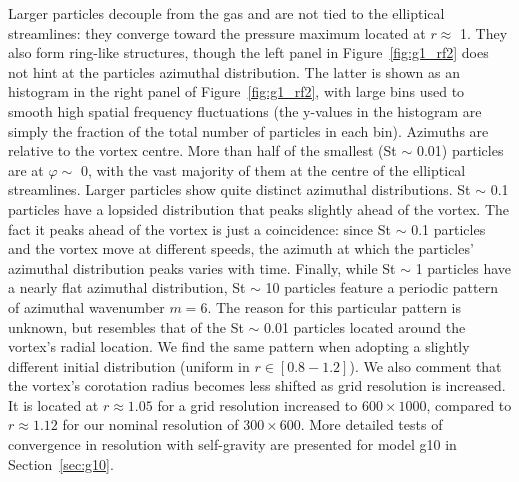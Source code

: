 \documentclass[a4paper,usenatbib]{mnras}
\begin{document}
Larger particles decouple from the gas and are not tied to the
elliptical streamlines: they converge toward the pressure maximum
located at $r \approx$ 1. They also form ring-like structures, though
the left panel in Figure~\ref{fig:g1_rf2} does not hint at the
particles azimuthal distribution. The latter is shown as an histogram
in the right panel of Figure~\ref{fig:g1_rf2}, with large bins used to
smooth high spatial frequency fluctuations (the y-values in the
histogram are simply the fraction of the total number of particles in
each bin). Azimuths are relative to the vortex centre.  More than half
of the smallest (St $\sim$ 0.01) particles are at $\varphi \sim$ 0,
with the vast majority of them at the centre of the elliptical
streamlines. Larger particles show quite distinct azimuthal
distributions.  St $\sim$ 0.1 particles have a lopsided distribution
that peaks slightly ahead of the vortex. The fact it peaks ahead of
the vortex is just a coincidence: since St $\sim$ 0.1 particles and
the vortex move at different speeds, the azimuth at which the
particles' azimuthal distribution peaks varies with time. Finally,
while St $\sim$ 1 particles have a nearly flat azimuthal distribution,
St $\sim$ 10 particles feature a periodic pattern of azimuthal
wavenumber $m=6$. The reason for this particular pattern is unknown,
but resembles that of the St $\sim$ 0.01 particles located around the
vortex's radial location.  We find the same pattern when adopting a
slightly different initial distribution (uniform in $r \in
[0.8-1.2]$). We also comment that the vortex's corotation radius
becomes less shifted as grid resolution is increased. It is located at
$r \approx 1.05$ for a grid resolution increased to $600\times 1000$,
compared to $r \approx 1.12$ for our nominal resolution of $300\times
600$. More detailed tests of convergence in resolution with
self-gravity are presented for model g10 in Section~\ref{sec:g10}.
\end{document}
